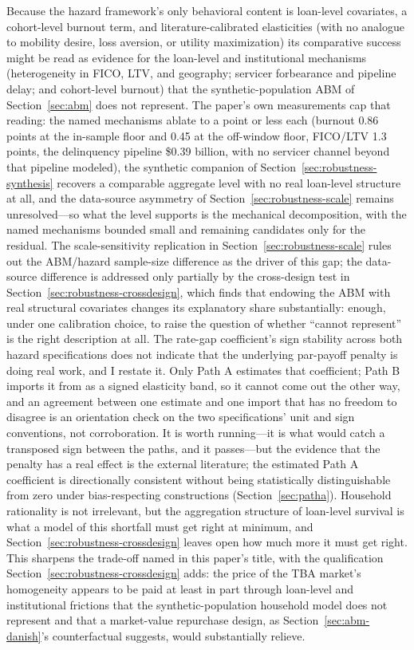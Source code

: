 \documentclass[12pt]{article}
\begin{document}
Because the hazard framework's only behavioral content is loan-level covariates, a cohort-level burnout term, and literature-calibrated elasticities (with no analogue to mobility desire, loss aversion, or utility maximization) its comparative success might be read as evidence for the loan-level and institutional mechanisms (heterogeneity in FICO, LTV, and geography; servicer forbearance and pipeline delay; and cohort-level burnout) that the synthetic-population ABM of Section~\ref{sec:abm} does not represent. The paper's own measurements cap that reading: the named mechanisms ablate to a point or less each (burnout 0.86 points at the in-sample floor and 0.45 at the off-window floor, FICO/LTV 1.3 points, the delinquency pipeline \$0.39 billion, with no servicer channel beyond that pipeline modeled), the synthetic companion of Section~\ref{sec:robustness-synthesis} recovers a comparable aggregate level with no real loan-level structure at all, and the data-source asymmetry of Section~\ref{sec:robustness-scale} remains unresolved---so what the level supports is the mechanical decomposition, with the named mechanisms bounded small and remaining candidates only for the residual. The scale-sensitivity replication in Section~\ref{sec:robustness-scale} rules out the ABM/hazard sample-size difference as the driver of this gap; the data-source difference is addressed only partially by the cross-design test in Section~\ref{sec:robustness-crossdesign}, which finds that endowing the ABM with real structural covariates changes its explanatory share substantially: enough, under one calibration choice, to raise the question of whether ``cannot represent'' is the right description at all. The rate-gap coefficient's sign stability across both hazard specifications does not indicate that the underlying par-payoff penalty is doing real work, and I restate it. Only Path A estimates that coefficient; Path B imports it from \citet{liebersohn2024} as a signed elasticity band, so it cannot come out the other way, and an agreement between one estimate and one import that has no freedom to disagree is an orientation check on the two specifications' unit and sign conventions, not corroboration. It is worth running---it is what would catch a transposed sign between the paths, and it passes---but the evidence that the penalty has a real effect is the external literature; the estimated Path A coefficient is directionally consistent without being statistically distinguishable from zero under bias-respecting constructions (Section~\ref{sec:patha}). Household rationality is not irrelevant, but the aggregation structure of loan-level survival is what a model of this shortfall must get right at minimum, and Section~\ref{sec:robustness-crossdesign} leaves open how much more it must get right. This sharpens the trade-off named in this paper's title, with the qualification Section~\ref{sec:robustness-crossdesign} adds: the price of the TBA market's homogeneity appears to be paid at least in part through loan-level and institutional frictions that the synthetic-population household model does not represent and that a market-value repurchase design, as Section~\ref{sec:abm-danish}'s counterfactual suggests, would substantially relieve.
\end{document}
